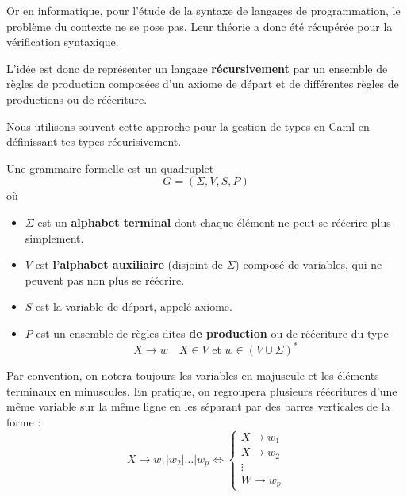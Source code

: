 \vspace{0.3cm}

Or en informatique, pour l'étude de la syntaxe de langages de programmation, le problème du contexte ne se pose pas. 
Leur théorie a donc été récupérée pour la vérification syntaxique. 

\vspace{0.3cm}

L'idée est donc de représenter un langage \textbf{récursivement} par un ensemble de règles de production composées 
d'un axiome de départ et de différentes règles de productions ou de réécriture. 

Nous utilisons souvent cette approche pour la gestion de types en Caml en définissant tes types récurisivement. 

\newpage 

\begin{definition}
    Une grammaire formelle est un quadruplet 
        \[ G = (\Sigma, V, S, P) \] 
    où 
    \begin{itemize}
        \item $\Sigma$ est un \textbf{alphabet terminal} dont chaque élément ne peut se réécrire plus simplement. 
        \item $V$ est \textbf{l'alphabet auxiliaire} (disjoint de $\Sigma$) composé de variables, qui ne 
        peuvent pas non plus se réécrire. 
        \item $S$ est la variable de départ, appelé axiome. 
        \item $P$ est un ensemble de règles dites \textbf{de production} ou de réécriture du type 
            \[ X \longrightarrow w \quad X \in V \text{ et } w \in \left( V \cup \Sigma \right)^* \] 
    \end{itemize}
\end{definition}

Par convention, on notera toujours les variables en majuscule et les éléments terminaux en minuscules. 
En pratique, on regroupera plusieurs réécritures d'une même variable sur la même ligne en les séparant par 
des barres verticales de la forme :
    \[ X \longrightarrow w_1 | w_2 | \dots | w_p \iff 
        \begin{cases}
            X \longrightarrow w_1 \\ 
            X \longrightarrow w_2 \\ 
            \vdots \\ 
            W \longrightarrow w_p 
        \end{cases}
    \] 


